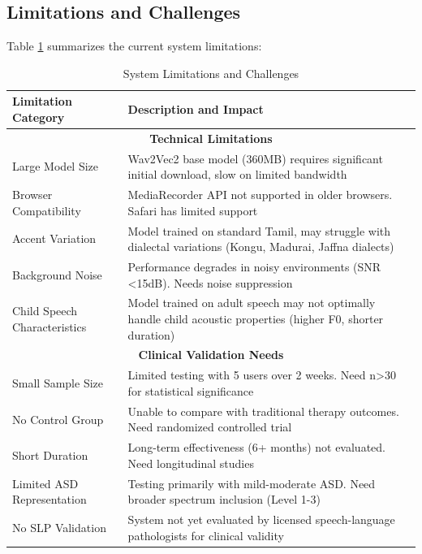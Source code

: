 \documentclass[12pt,a4paper]{article}
\begin{document}
\subsection{Limitations and Challenges}

Table \ref{tab:limitations} summarizes the current system limitations:

\begin{table}[H]
\centering
\caption{System Limitations and Challenges}
\label{tab:limitations}
\small
\begin{tabular}{p{5cm}p{8.5cm}}
\toprule
\textbf{Limitation Category} & \textbf{Description and Impact} \\
\midrule
\multicolumn{2}{c}{\textbf{Technical Limitations}} \\
\midrule
Large Model Size & Wav2Vec2 base model (360MB) requires significant initial download, slow on limited bandwidth \\
\hline
Browser Compatibility & MediaRecorder API not supported in older browsers. Safari has limited support \\
\hline
Accent Variation & Model trained on standard Tamil, may struggle with dialectal variations (Kongu, Madurai, Jaffna dialects) \\
\hline
Background Noise & Performance degrades in noisy environments (SNR <15dB). Needs noise suppression \\
\hline
Child Speech Characteristics & Model trained on adult speech may not optimally handle child acoustic properties (higher F0, shorter duration) \\
\midrule
\multicolumn{2}{c}{\textbf{Clinical Validation Needs}} \\
\midrule
Small Sample Size & Limited testing with 5 users over 2 weeks. Need n>30 for statistical significance \\
\hline
No Control Group & Unable to compare with traditional therapy outcomes. Need randomized controlled trial \\
\hline
Short Duration & Long-term effectiveness (6+ months) not evaluated. Need longitudinal studies \\
\hline
Limited ASD Representation & Testing primarily with mild-moderate ASD. Need broader spectrum inclusion (Level 1-3) \\
\hline
No SLP Validation & System not yet evaluated by licensed speech-language pathologists for clinical validity \\
\bottomrule
\end{tabular}
\end{table}
\end{document}

